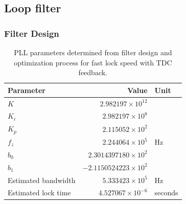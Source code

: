 \subsection{Loop filter}
	\subsubsection{Filter Design}
		\begin{table}[h!]
			\centering
			\def\arraystretch{1.5}		
			\setlength\arrayrulewidth{0.75pt}
			\setlength{\tabcolsep}{1em} %
			\begin{tabular}{|l|r|l|}
				\hline 
				\rule[-1ex]{0pt}{2.5ex} \cellcolor{gray!40}\textbf{Parameter} & \cellcolor{gray!40}\textbf{Value} & \cellcolor{gray!40}\textbf{Unit }\\ 
				\hline 
				\rule[-1ex]{0pt}{2.5ex} \textbf{$K$}  & $2.982197\times10^{12}$ &  \\
				\hline 
				\rule[-1ex]{0pt}{2.5ex} \textbf{$K_i$}  & $2.982197\times10^{8}$ &  \\
				\hline 
				\rule[-1ex]{0pt}{2.5ex} \textbf{$K_p$}  & $2.115052\times10^{2}$ &  \\
				\hline 
				\rule[-1ex]{0pt}{2.5ex} \textbf{$f_z$} & $2.244064\times10^5$ & Hz\\
				\hline 
				\rule[-1ex]{0pt}{2.5ex} \textbf{$b_0$}  & $2.3014397180\times10^2$  &\\
				\hline 
				\rule[-1ex]{0pt}{2.5ex} \textbf{$b_1$}  & $-2.1150524223\times10^2$  & \\
				\hline 
				\rule[-1ex]{0pt}{2.5ex} Estimated bandwidth & $5.333423\times10^5$ & Hz \\
				\hline 
				\rule[-1ex]{0pt}{2.5ex} Estimated lock time & $4.527067\times10^{-6}$ & seconds \\
				\hline 
			\end{tabular} 
			\caption{PLL parameters determined from filter design and optimization process for fast lock speed with TDC feedback.}
			\label{filter_params_fast_lock}
		\end{table}   

